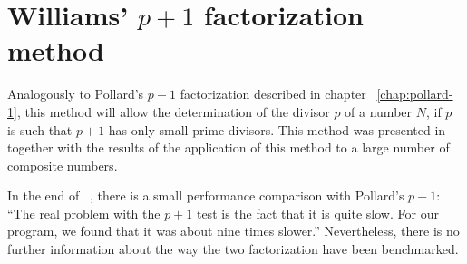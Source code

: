 \chapter{Williams' $p+1$ factorization method \label{chap:william+1}}

Analogously to Pollard's $p-1$ factorization described in chapter
~\ref{chap:pollard-1}, this method will allow the determination of the divisor
$p$ of a number $N$, if $p$ is such that $p+1$ has only small prime divisors.
This method was presented in ~\cite{Williams:p+1} together with the results of
the application of this method to a large number of composite numbers.

\begin{remark}
  In the end of ~\cite{Williams:p+1}, there is a small performance comparison
  with Pollard's $p-1$:
  ``The real problem with the $p+1$ test is the fact that it is quite slow. For
  our program, we found that it was about nine times slower.''
  Nevertheless, there is no further information about the way the two
  factorization have been benchmarked.
\end{remark}


